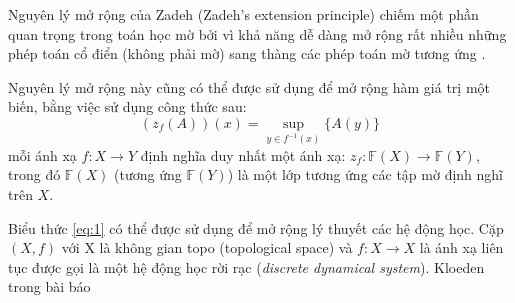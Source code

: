 \documentclass[../report.tex]{subfiles}
\begin{document}
Nguyên lý mở rộng của Zadeh (Zadeh's extension principle) chiếm một phần 
quan trọng trong toán học mờ bởi vì khả năng dễ dàng mở rộng rất nhiều những 
phép toán cổ điển (không phải mờ) sang thàng các phép toán mờ tương ứng \cite{Zadeh-extension}.

Nguyên lý mở rộng này cũng có thể được sử dụng để mở rộng hàm giá trị một biến,
bằng việc sử dụng công thức sau:
\begin{equation}
(z_f(A))(x) = \sup_{y \in f^{-1}(x)} \{ A(y) \}
\label{eq:1}
\end{equation}
mỗi ánh xạ $f: X \rightarrow Y$ định nghĩa duy nhất một ánh xạ:
$z_f: \mathbb{F}(X) \rightarrow \mathbb{F}(Y)$, trong đó $\mathbb{F}(X)$
(tương ứng $\mathbb{F}(Y)$) là một lớp tương ứng các tập mờ 
định nghĩ trên $X$.

Biểu thức \eqref{eq:1} có thể được sử dụng để mở rộng
lý thuyết các hệ động học. Cặp $(X, f)$ với X là không gian topo (topological space) 
và $f: X \rightarrow X$ là ánh xạ liên tục được gọi là một hệ động học rời rạc
(\textit{discrete dynamical system}). Kloeden trong bài báo \cite{Kloeden}
\end{document}
